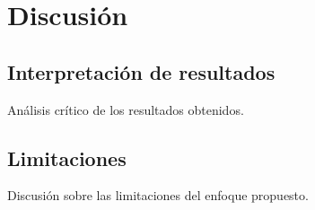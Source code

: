 \chapter{Discusión}

\section{Interpretación de resultados}
Análisis crítico de los resultados obtenidos.

\section{Limitaciones}
Discusión sobre las limitaciones del enfoque propuesto.